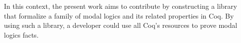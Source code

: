 \documentclass[sigconf]{acmart}
\begin{document}
In this context, the present work aims to contribute by constructing a library
that formalize a family of modal logics and its related properties in Coq.
By using such a library, a developer could use all Coq's resources to prove
modal logics facts.



\end{document}
